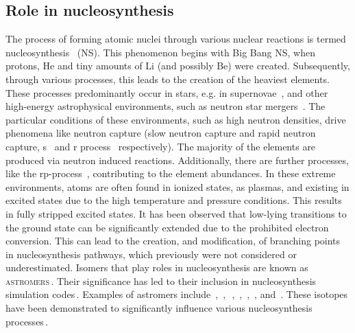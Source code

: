 \subsection{Role in nucleosynthesis}\label{subsec:intro:role_in_nucleosynthesis}
The process of forming atomic nuclei through various nuclear reactions is termed nucleosynthesis~\cite{rolfs1988cauldrons} (\textsc{NS}). This phenomenon begins with Big Bang \textsc{NS}, when protons, He and tiny amounts of Li (and possibly Be) were created. Subsequently, through various processes, this leads to the creation of the heaviest elements.
These processes predominantly occur in stars, e.g. in supernovae~\cite{WoosleyHoward1978}, and other high-energy astrophysical environments, such as neutron star mergers~\cite{Freiburghaus_1999}. The particular conditions of these environments, such as high neutron densities, drive phenomena like neutron capture (slow neutron capture and rapid neutron capture, s~\cite{RevModPhys.83.157} and r process~\cite{COWAN1991267} respectively). 
The majority of the elements are produced via neutron induced reactions. Additionally, there are further processes, like the rp-process~\cite{SCHATZ1998167}, contributing to the element abundances.
In these extreme environments, atoms are often found in ionized states, as plasmas, and existing in excited states due to the high temperature and pressure conditions. This results in fully stripped excited states.
\newpar
It has been observed that low-lying \ezerotrans transitions to the ground state can be significantly extended due to the prohibited electron conversion. This can lead to the creation, and modification, of branching points in nucleosynthesis pathways, which previously were not considered or underestimated.
Isomers that play roles in nucleosynthesis are known as \textsc{astromers}\,\cite{Misch_2021_1,Misch_2021_2}. Their significance has led to their inclusion in nucleosynthesis simulation codes\,\cite{ReifarthNucleosynthesis}. Examples of astromers include \,, \,, \,\,\cite{nucleosynthesis93mMo}, \,, \,, \,, and \,. These isotopes have been demonstrated to significantly influence various nucleosynthesis processes\,\cite{gerken2021thesis,IsomersCosmosProceeding}.
\begin{center}
    \vspace*{1cm}
    \vspace*{\fill}
  \end{center}